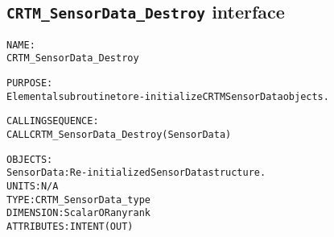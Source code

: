 \subsection{\texttt{CRTM\_SensorData\_Destroy} interface}
  \label{sec:CRTM_SensorData_Destroy_interface}
  \begin{alltt}
 
  NAME:
        CRTM_SensorData_Destroy
  
  PURPOSE:
        Elemental subroutine to re-initialize CRTM SensorData objects.
 
  CALLING SEQUENCE:
        CALL CRTM_SensorData_Destroy( SensorData )
 
  OBJECTS:
        SensorData:   Re-initialized SensorData structure.
                      UNITS:      N/A
                      TYPE:       CRTM_SensorData_type
                      DIMENSION:  Scalar OR any rank
                      ATTRIBUTES: INTENT(OUT)
 
  \end{alltt}
